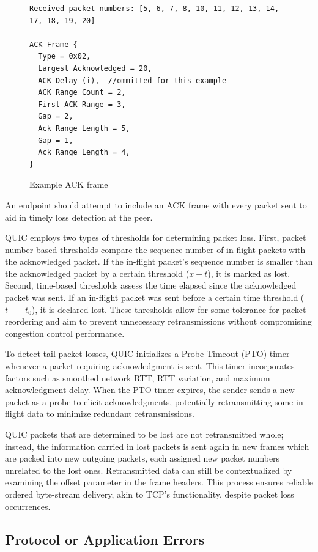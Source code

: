 \begin{figure}[htb]
    \centering
\begin{verbatim}
Received packet numbers: [5, 6, 7, 8, 10, 11, 12, 13, 14, 17, 18, 19, 20]

ACK Frame {
  Type = 0x02,
  Largest Acknowledged = 20,
  ACK Delay (i),  //ommitted for this example
  ACK Range Count = 2,
  First ACK Range = 3,        
  Gap = 2,
  Ack Range Length = 5,
  Gap = 1,
  Ack Range Length = 4,
}
\end{verbatim}
    \caption{Example ACK frame}
    \label{ack_frame_example}
\end{figure}

An endpoint should attempt to include an ACK frame with every packet sent to aid in timely loss detection at the peer. 

QUIC employs two types of thresholds for determining packet loss. First, packet number-based thresholds compare the sequence number of in-flight packets with the acknowledged packet. If the in-flight packet's sequence number is smaller than the acknowledged packet by a certain threshold ($x - t$), it is marked as lost. Second, time-based thresholds assess the time elapsed since the acknowledged packet was sent. If an in-flight packet was sent before a certain time threshold ($t -− t_0$), it is declared lost. These thresholds allow for some tolerance for packet reordering and aim to prevent unnecessary retransmissions without compromising congestion control performance.

To detect tail packet losses, QUIC initializes a Probe Timeout (PTO) timer whenever a packet requiring acknowledgment is sent. This timer incorporates factors such as smoothed network RTT, RTT variation, and maximum acknowledgment delay. When the PTO timer expires, the sender sends a new packet as a probe to elicit acknowledgments, potentially retransmitting some in-flight data to minimize redundant retransmissions.

QUIC packets that are determined to be lost are not retransmitted whole; instead, the information carried in lost packets is sent again in new frames which are packed into new outgoing packets, each assigned new packet numbers unrelated to the lost ones. Retransmitted data can still be contextualized by examining the offset parameter in the frame headers. This process ensures reliable ordered byte-stream delivery, akin to TCP's functionality, despite packet loss occurrences.

\subsection{Protocol or Application Errors}


